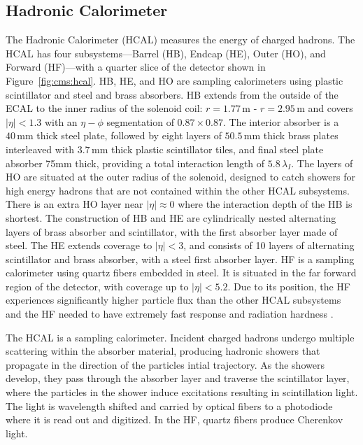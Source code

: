 \subsection{Hadronic Calorimeter}\label{ch:cms:hcal}
The Hadronic Calorimeter (HCAL) measures the energy of charged hadrons. 
The HCAL has four subsystems---Barrel (HB), Endcap (HE), Outer (HO), and Forward (HF)---with a quarter slice of the detector shown in Figure~\ref{fig:cms:hcal}.  HB, HE, and HO are sampling calorimeters using plastic scintillator and steel and brass absorbers. HB extends from the outside of the ECAL to the inner radius of the solenoid coil: $r=1.77\,\mathrm{m}$ - $r=2.95\,\mathrm{m}$ and covers $|\eta| < 1.3$ with an $\eta-\phi$ segmentation of $0.87\times0.87$. The interior absorber is a $40\,\mathrm{mm}$ thick steel plate, followed by eight layers of $50.5\,\mathrm{mm}$ thick brass plates interleaved with $3.7\,\mathrm{mm}$ thick plastic scintillator tiles, and final steel plate absorber 75mm thick, providing a total interaction length of $5.8\,\lambda_I$. The layers of HO are situated at the outer radius of the solenoid, designed to catch showers for high energy hadrons that are not contained within the other HCAL subsystems. There is an extra HO layer near $|\eta|\approx 0$ where the interaction depth of the HB is shortest. The construction of HB and HE are cylindrically nested alternating layers of brass absorber and scintillator, with the first absorber layer made of steel. The HE extends coverage to $|\eta| < 3$, and consists of 10 layers of alternating scintillator and brass absorber, with a steel first absorber layer.
HF is a sampling calorimeter using quartz fibers embedded in steel. It is situated in the far forward region of the detector, with coverage up to $|\eta| < 5.2$. Due to its position, the HF experiences significantly higher particle flux than the other HCAL subsystems and the HF needed to have extremely fast response and radiation hardness
\cite{CERN-LHCC-97-031}.




The HCAL is a sampling calorimeter. Incident charged hadrons undergo multiple scattering within the absorber material, producing hadronic showers that propagate in the direction of the particles intial trajectory. As the showers develop, they pass through the absorber layer and traverse the scintillator layer, where the particles in the shower induce excitations resulting in scintillation light. The light is wavelength shifted and carried by optical fibers to a photodiode where it is read out and digitized. In the HF, quartz fibers produce Cherenkov light. 



